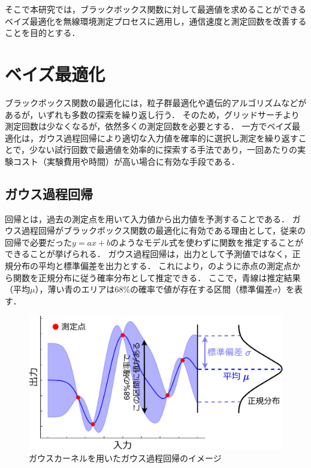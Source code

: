 \documentclass[twocolumn]{ltjarticle}
\begin{document}
そこで本研究では，ブラックボックス関数に対して最適値を求めることができるベイズ最適化を無線環境測定プロセスに適用し，通信速度と測定回数を改善することを目的とする．

\section{ベイズ最適化}

ブラックボックス関数の最適化には，粒子群最適化や遺伝的アルゴリズムなどがあるが，いずれも多数の探索を繰り返し行う．
そのため，グリッドサーチより測定回数は少なくなるが，依然多くの測定回数を必要とする．
一方でベイズ最適化は，ガウス過程回帰により適切な入力値を確率的に選択し測定を繰り返すことで，少ない試行回数で最適値を効率的に探索する手法であり，一回あたりの実験コスト（実験費用や時間）が高い場合に有効な手段である．

\subsection{ガウス過程回帰}

回帰とは，過去の測定点を用いて入力値から出力値を予測することである．
ガウス過程回帰がブラックボックス関数の最適化に有効である理由として，従来の回帰で必要だった\(y=ax+b\)のようなモデル式を使わずに関数を推定することができることが挙げられる．
ガウス過程回帰は，出力として予測値ではなく，正規分布の平均と標準偏差を出力とする．
これにより，のように赤点の測定点から関数を正規分布に従う確率分布として推定できる．
ここで，青線は推定結果（平均\(\mu\)），薄い青のエリアは68\%の確率で値が存在する区間（標準偏差\(\sigma\)）を表す．
\setlength\intextsep{3pt}
\setlength\textfloatsep{3pt}
\begin{figure}[htbp]
	\centering
	\includegraphics[width=0.83\linewidth]{./figures/material_5_kernel_v2.pdf}
	\vspace*{-0.3cm}
	\caption{ガウスカーネルを用いたガウス過程回帰のイメージ} \label{fig:gaussian_process}
\end{figure}
\end{document}
